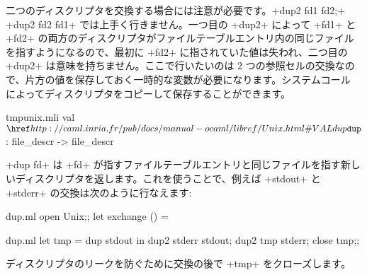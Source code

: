 二つのディスクリプタを交換する場合には注意が必要です。\ml+dup2 fd1 fd2;+ \ml+dup2 fd2 fd1+ では上手く行きません。一つ目の \ml+dup2+ によって \ml+fd1+ と \ml+fd2+ の両方のディスクリプタがファイルテーブルエントリ内の同じファイルを指すようになるので、最初に \ml+fd2+ に指されていた値は失われ、二つ目の \ml+dup2+ は意味を持ちません。ここで行いたいのは 2 つの参照セルの交換なので、片方の値を保存しておく一時的な変数が必要になります。システムコール  によってディスクリプタをコピーして保存することができます。
%
\begin{listingcodefile}{tmpunix.mli}
val $\libvalue{Unix}{dup}$ : file_descr -> file_descr
\end{listingcodefile}
%
\ml+dup fd+ は \ml+fd+ が指すファイルテーブルエントリと同じファイルを指す新しいディスクリプタを返します。これを使うことで、例えば \ml+stdout+ と \ml+stderr+ の交換は次のように行なえます:
%
\begin{codefile}{dup.ml}
open Unix;;
let exchange () =
\end{codefile}
%
\begin{listingcodefile}{dup.ml}
let tmp = dup stdout in
dup2 stderr stdout;
dup2 tmp stderr;
close tmp;;
\end{listingcodefile}
%
ディスクリプタのリークを防ぐために交換の後で \ml+tmp+ をクローズします。

